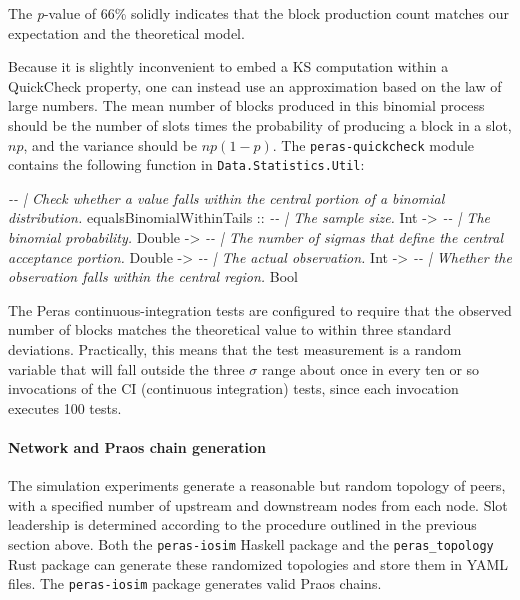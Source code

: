 \documentclass[10pt]{article}
\newenvironment{Shaded}{}{}
\newcommand{\CommentTok}[1]{\textcolor[rgb]{0.38,0.63,0.69}{\textit{#1}}}
\newcommand{\DataTypeTok}[1]{\textcolor[rgb]{0.56,0.13,0.00}{#1}}
\newcommand{\OtherTok}[1]{\textcolor[rgb]{0.00,0.44,0.13}{#1}}
\begin{document}
The \emph{p}-value of 66\% solidly indicates that the block production
count matches our expectation and the theoretical model.

Because it is slightly inconvenient to embed a KS computation within a
QuickCheck property, one can instead use an approximation based on the
law of large numbers. The mean number of blocks produced in this
binomial process should be the number of slots times the probability of
producing a block in a slot, \(n p\), and the variance should be
\(n p (1-p)\). The \texttt{peras-quickcheck} module contains the
following function in \texttt{Data.Statistics.Util}:

\begin{Shaded}
\begin{Highlighting}[]
\CommentTok{{-}{-} | Check whether a value falls within the central portion of a binomial distribution.}
\OtherTok{equalsBinomialWithinTails ::}
  \CommentTok{{-}{-} | The sample size.}
  \DataTypeTok{Int} \OtherTok{{-}\textgreater{}}
  \CommentTok{{-}{-} | The binomial probability.}
  \DataTypeTok{Double} \OtherTok{{-}\textgreater{}}
  \CommentTok{{-}{-} | The number of sigmas that define the central acceptance portion.}
  \DataTypeTok{Double} \OtherTok{{-}\textgreater{}}
  \CommentTok{{-}{-} | The actual observation.}
  \DataTypeTok{Int} \OtherTok{{-}\textgreater{}}
  \CommentTok{{-}{-} | Whether the observation falls within the central region.}
  \DataTypeTok{Bool}
\end{Highlighting}
\end{Shaded}

The Peras continuous-integration tests are configured to require that
the observed number of blocks matches the theoretical value to within
three standard deviations. Practically, this means that the test
measurement is a random variable that will fall outside the three $\sigma$
range about once in every ten or so invocations of the CI (continuous
integration) tests, since each invocation executes 100 tests.

\paragraph{Network and Praos chain
generation}\label{network-and-praos-chain-generation}

The simulation experiments generate a reasonable but random topology of
peers, with a specified number of upstream and downstream nodes from
each node. Slot leadership is determined according to the procedure
outlined in the previous section above. Both the \texttt{peras-iosim}
Haskell package and the \texttt{peras\_topology} Rust package can
generate these randomized topologies and store them in YAML files. The
\texttt{peras-iosim} package generates valid Praos chains.
\end{document}
